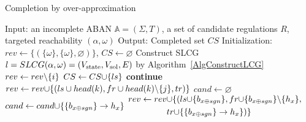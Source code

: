 \begin{algorithm}[ht]
\caption{Completion by over-approximation}\label{algComOver}
\begin{algorithmic}
    \State Input: an incomplete ABAN $\mathbb{A}=(\Sigma,T)$, a set of candidate regulations $R$, targeted reachability $(\alpha,\omega)$
    \State Output: Completed set $CS$ 
    \State Initialization: $rev\gets\{(\{\omega\},\{\omega\},\varnothing)\}$, $CS\gets \varnothing$
    \State Construct SLCG $l=SLCG(\alpha,\omega)=(V_{\mathrm{state}},V_{\mathrm{sol}}, E)$ by Algorithm~\ref{AlgConstructLCG}
        \State\Return{$(\true,\varnothing)$}
    \EndIf
            \State $rev\gets rev \miset{i}$
                \State $CS\gets CS\addset{ls}$
                \State \textbf{continue}
            \EndIf
                        \State $rev\gets rev\addset{(ls\cup head(k), fr\cup head(k)\miset{j},tr)}$
                    \EndIf
                \EndFor
            \EndFor
            \State $cand\gets\varnothing$
                    \State $cand \gets cand\addset{\acm{b_{x \oplus sgn}}{h_{1-x}}{h_x}}$
                    \State 
                        $\begin{aligned}
                            rev\gets rev&\addset{(ls\addset{b_{x \oplus sgn}}, fr\addset{b_{x \oplus sgn}}\miset{h_x},\\
                            &tr\addset{\acm{b_{x \oplus sgn}}{h_{1-x}}{h_x}})}
                        \end{aligned}$
                \EndIf
            \EndFor
        \EndFor
    \EndWhile
        \State\Return{$(\false,\varnothing)$}
    \EndIf
    \State{}
\end{algorithmic}
\end{algorithm}

